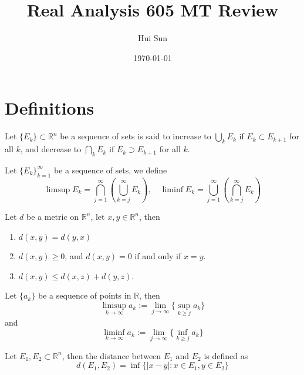 \documentclass[openany]{book}
\title{Real Analysis 605 MT Review}
\date{\today}
\author{Hui Sun}
\newcommand{\R}{\mathbb{R}}
\begin{document}
\maketitle

\newpage
\tableofcontents

\chapter{Definitions}
\setcounter{chapter}{1}

\begin{defn}
    Let $\{E_k\}\subset\R^n$ be a sequence of sets is said to increase to $\bigcup_kE_k$ if $E_k\subset E_{k+1}$ for all $k$, and decrease to $\bigcap_kE_k$ if $E_k\supset E_{k+1}$ for all $k$.
\end{defn}
\begin{defn}
    Let $\{E_k\}_{k=1}^\infty$ be a sequence of sets, we define 
    \begin{equation*}
        \limsup E_k=\bigcap_{j=1}^\infty\left(\bigcup_{k=j}^\infty E_k\right), \quad \liminf E_k=\bigcup_{j=1}^\infty\left(\bigcap_{k=j}^\infty E_k\right)
    \end{equation*}
\end{defn}
\begin{defn}[metric]
    Let $d$ be a metric on $\R^n$, let $x,y\in\R^n$, then 
    \begin{enumerate}
        \item $d(x,y)=d(y,x)$
        \item $d(x,y)\geq 0$, and $d(x,y)=0$ if and only if $x=y$.
        \item $d(x,y)\leq d(x,z)+d(y,z)$.
    \end{enumerate}
\end{defn}
\begin{defn}
    Let $\{a_k\}$ be a sequence of points in $\R$, then 
    \begin{equation*}
        \limsup_{k\to\infty}a_k:=\lim_{j\to\infty}\{\sup_{k\geq j}a_k\}
    \end{equation*}
    and 
    \begin{equation*}
        \liminf_{k\to\infty}a_k:=\lim_{j\to\infty}\{\inf_{k\geq j}a_k\}
    \end{equation*}
\end{defn}
\begin{defn}
    Let $E_1,E_2\subset\R^n$, then the distance between $E_1$ and $E_2$ is defined as 
    \begin{equation*}
        d(E_1,E_2)=\inf\{|x-y|: x\in E_1,y\in E_2\}
    \end{equation*}
\end{defn}
\end{document}
